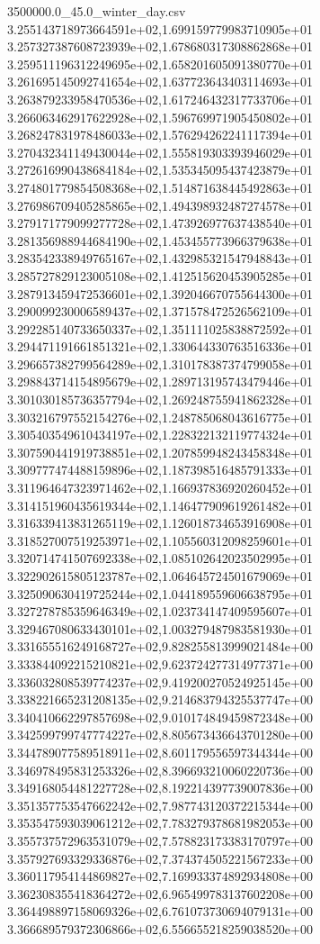 \begin{filecontents*}{3500000.0_45.0_winter_day.csv}
3.255143718973664591e+02,1.699159779983710905e+01
3.257327387608723939e+02,1.678680317308862868e+01
3.259511196312249695e+02,1.658201605091380770e+01
3.261695145092741654e+02,1.637723643403114693e+01
3.263879233958470536e+02,1.617246432317733706e+01
3.266063462917622928e+02,1.596769971905450802e+01
3.268247831978486033e+02,1.576294262241117394e+01
3.270432341149430044e+02,1.555819303393946029e+01
3.272616990438684184e+02,1.535345095437423879e+01
3.274801779854508368e+02,1.514871638445492863e+01
3.276986709405285865e+02,1.494398932487274578e+01
3.279171779099277728e+02,1.473926977637438540e+01
3.281356988944684190e+02,1.453455773966379638e+01
3.283542338949765167e+02,1.432985321547948843e+01
3.285727829123005108e+02,1.412515620453905285e+01
3.287913459472536601e+02,1.392046670755644300e+01
3.290099230006589437e+02,1.371578472526562109e+01
3.292285140733650337e+02,1.351111025838872592e+01
3.294471191661851321e+02,1.330644330763516336e+01
3.296657382799564289e+02,1.310178387374799058e+01
3.298843714154895679e+02,1.289713195743479446e+01
3.301030185736357794e+02,1.269248755941862328e+01
3.303216797552154276e+02,1.248785068043616775e+01
3.305403549610434197e+02,1.228322132119774324e+01
3.307590441919738851e+02,1.207859948243458348e+01
3.309777474488159896e+02,1.187398516485791333e+01
3.311964647323971462e+02,1.166937836920260452e+01
3.314151960435619344e+02,1.146477909619261482e+01
3.316339413831265119e+02,1.126018734653916908e+01
3.318527007519253971e+02,1.105560312098259601e+01
3.320714741507692338e+02,1.085102642023502995e+01
3.322902615805123787e+02,1.064645724501679069e+01
3.325090630419725244e+02,1.044189559606638795e+01
3.327278785359646349e+02,1.023734147409595607e+01
3.329467080633430101e+02,1.003279487983581930e+01
3.331655516249168727e+02,9.828255813999021484e+00
3.333844092215210821e+02,9.623724277314977371e+00
3.336032808539774237e+02,9.419200270524925145e+00
3.338221665231208135e+02,9.214683794325537747e+00
3.340410662297857698e+02,9.010174849459872348e+00
3.342599799747774227e+02,8.805673436643701280e+00
3.344789077589518911e+02,8.601179556597344344e+00
3.346978495831253326e+02,8.396693210060220736e+00
3.349168054481227728e+02,8.192214397739007836e+00
3.351357753547662242e+02,7.987743120372215344e+00
3.353547593039061212e+02,7.783279378681982053e+00
3.355737572963531079e+02,7.578823173383170797e+00
3.357927693329336876e+02,7.374374505221567233e+00
3.360117954144869827e+02,7.169933374892934808e+00
3.362308355418364272e+02,6.965499783137602208e+00
3.364498897158069326e+02,6.761073730694079131e+00
3.366689579372306866e+02,6.556655218259038520e+00

\end{filecontents*}
